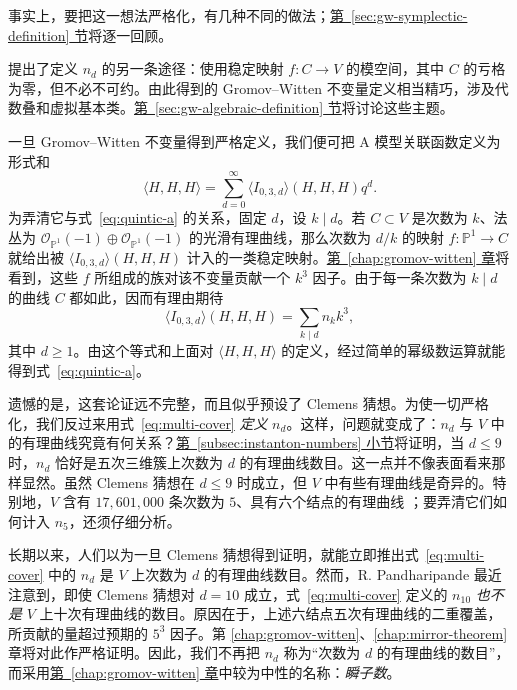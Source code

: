 事实上，要把这一想法严格化，有几种不同的做法；\hyperref[sec:gw-symplectic-definition]{第~\ref*{sec:gw-symplectic-definition} 节}将逐一回顾。

 提出了定义 $n_d$ 的另一条途径：使用稳定映射 $f:C\to V$ 的模空间，其中 $C$ 的亏格为零，但不必不可约。由此得到的 Gromov--Witten 不变量定义相当精巧，涉及代数叠和虚拟基本类。\hyperref[sec:gw-algebraic-definition]{第~\ref*{sec:gw-algebraic-definition} 节}将讨论这些主题。

一旦 Gromov--Witten 不变量得到严格定义，我们便可把 A 模型关联函数定义为形式和
\[
\langle H,H,H\rangle=\sum_{d=0}^{\infty}\langle I_{0,3,d}\rangle(H,H,H)q^d.
\]
为弄清它与式~\eqref{eq:quintic-a} 的关系，固定 $d$，设 $k\mid d$。若 $C\subset V$ 是次数为 $k$、法丛为 $\mathcal O_{\mathbb P^1}(-1)\oplus\mathcal O_{\mathbb P^1}(-1)$ 的光滑有理曲线，那么次数为 $d/k$ 的映射 $f:\mathbb P^1\to C$ 就给出被 $\langle I_{0,3,d}\rangle(H,H,H)$ 计入的一类稳定映射。\hyperref[chap:gromov-witten]{第~\ref*{chap:gromov-witten} 章}将看到，这些 $f$ 所组成的族对该不变量贡献一个 $k^3$ 因子。由于每一条次数为 $k\mid d$ 的曲线 $C$ 都如此，因而有理由期待
\begin{equation}\label{eq:multi-cover}
\langle I_{0,3,d}\rangle(H,H,H)=\sum_{k\mid d}n_k k^3,
\end{equation}
其中 $d\geq1$。由这个等式和上面对 $\langle H,H,H\rangle$ 的定义，经过简单的幂级数运算就能得到式~\eqref{eq:quintic-a}。

遗憾的是，这套论证远不完整，而且似乎预设了 Clemens 猜想。为使一切严格化，我们反过来用式~\eqref{eq:multi-cover} \emph{定义} $n_d$。这样，问题就变成了：$n_d$ 与 $V$ 中的有理曲线究竟有何关系？\hyperref[subsec:instanton-numbers]{第~\ref*{subsec:instanton-numbers} 小节}将证明，当 $d\leq9$ 时，$n_d$ 恰好是五次三维簇上次数为 $d$ 的有理曲线数目。这一点并不像表面看来那样显然。虽然 Clemens 猜想在 $d\leq9$ 时成立，但 $V$ 中有些有理曲线是奇异的。特别地，$V$ 含有 $17{,}601{,}000$ 条次数为 $5$、具有六个结点的有理曲线 ；要弄清它们如何计入 $n_5$，还须仔细分析。

长期以来，人们以为一旦 Clemens 猜想得到证明，就能立即推出式~\eqref{eq:multi-cover} 中的 $n_d$ 是 $V$ 上次数为 $d$ 的有理曲线数目。然而，R. Pandharipande 最近注意到，即使 Clemens 猜想对 $d=10$ 成立，式~\eqref{eq:multi-cover} 定义的 $n_{10}$ \emph{也不是} $V$ 上十次有理曲线的数目。原因在于，上述六结点五次有理曲线的二重覆盖，所贡献的量超过预期的 $5^3$ 因子。第 \hyperref[chap:gromov-witten]{\ref*{chap:gromov-witten}}、\hyperref[chap:mirror-theorem]{\ref*{chap:mirror-theorem}} 章将对此作严格证明。因此，我们不再把 $n_d$ 称为“次数为 $d$ 的有理曲线的数目”，而采用\hyperref[chap:gromov-witten]{第~\ref*{chap:gromov-witten} 章}中较为中性的名称：\emph{瞬子数}。

